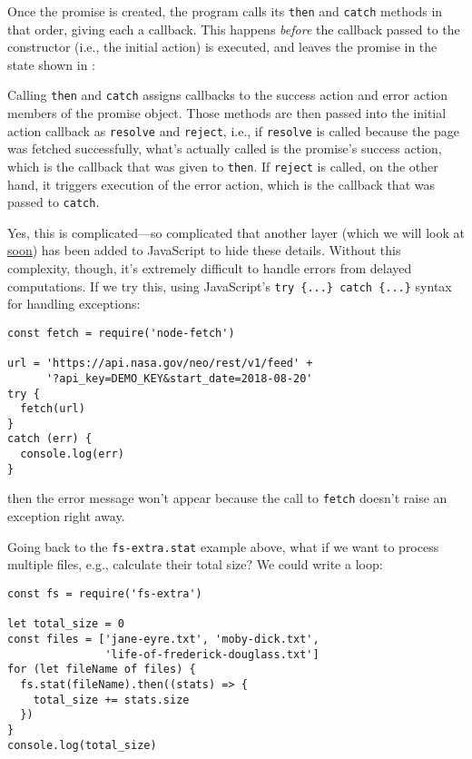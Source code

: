 Once the promise is created,
the program calls its \texttt{then} and \texttt{catch} methods in that order,
giving each a callback.
This happens \emph{before} the callback passed to the constructor
(i.e., the initial action) is executed,
and leaves the promise in the state shown in :


Calling \texttt{then} and \texttt{catch} assigns callbacks to the success action and error action members of the promise object.
Those methods are then passed into the initial action callback as \texttt{resolve} and \texttt{reject},
i.e.,
if \texttt{resolve} is called because the page was fetched successfully,
what's actually called is the promise's success action,
which is the callback that was given to \texttt{then}.
If \texttt{reject} is called,
on the other hand,
it triggers execution of the error action,
which is the callback that was passed to \texttt{catch}.

Yes,
this is complicated---so complicated that another layer
(which we will look at \protect\hyperlink{s:promises-async-await}{soon})
has been added to JavaScript to hide these details.
Without this complexity,
though,
it's extremely difficult to handle errors from delayed computations.
If we try this, using JavaScript's \texttt{try\ \{...\}\ catch\ \{...\}} syntax for handling exceptions:

\begin{verbatim}
const fetch = require('node-fetch')

url = 'https://api.nasa.gov/neo/rest/v1/feed' +
      '?api_key=DEMO_KEY&start_date=2018-08-20'
try {
  fetch(url)
}
catch (err) {
  console.log(err)
}
\end{verbatim}

\noindent
then the error message won't appear
because the call to \texttt{fetch} doesn't raise an exception right away.

Going back to the \texttt{fs-extra.stat} example above,
what if we want to process multiple files,
e.g.,
calculate their total size?
We could write a loop:

\begin{verbatim}
const fs = require('fs-extra')

let total_size = 0
const files = ['jane-eyre.txt', 'moby-dick.txt',
               'life-of-frederick-douglass.txt']
for (let fileName of files) {
  fs.stat(fileName).then((stats) => {
    total_size += stats.size
  })
}
console.log(total_size)
\end{verbatim}

